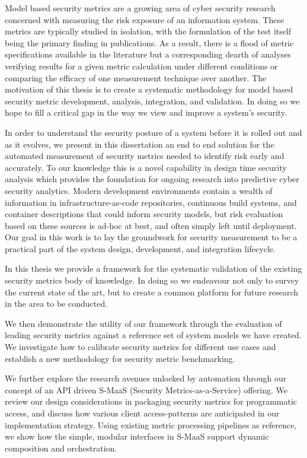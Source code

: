 Model based security metrics are a growing area of cyber security research concerned with measuring the risk exposure of an information system. These metrics are typically studied in isolation, with the formulation of the test itself being the primary finding in publications. As a result, there is a flood of metric specifications available in the literature but a corresponding dearth of analyses verifying results for a given metric calculation under different conditions or comparing the efficacy of one measurement technique over another. The motivation of this thesis is to create a systematic methodology for model based security metric development, analysis, integration, and validation. In doing so we hope to fill a critical gap in the way we view and improve a system’s security.   

In order to understand the security posture of a system before it is rolled out and as it evolves, we present in this dissertation an end to end solution for the automated measurement of security metrics needed to identify risk early and accurately. To our knowledge this is a novel capability in design time security analysis which provides the foundation for ongoing research into predictive cyber security analytics. Modern development environments contain a wealth of information in infrastructure-as-code repositories, continuous build systems, and container descriptions that could inform security models, but risk evaluation based on these sources is ad-hoc at best, and often simply left until deployment. Our goal in this work is to lay the groundwork for security measurement to be a practical part of the system design, development, and integration lifecycle.  

In this thesis we provide a framework for the systematic validation of the existing security metrics body of knowledge. In doing so we endeavour not only to survey the current state of the art, but to create a common platform for future research in the area to be conducted. 

We  then  demonstrate  the  utility  of  our  framework  through  the  evaluation  of  leading security metrics against a reference set of system models we have created.  We investigate how  to  calibrate  security  metrics  for  different  use  cases  and  establish  a new methodology  for security metric benchmarking. 

We further explore the research avenues unlocked by automation through our concept of an API driven S-MaaS (Security Metrics-as-a-Service) offering. We review our design considerations in packaging security metrics for programmatic access, and discuss how various client access-patterns are anticipated in our implementation strategy. Using existing metric processing pipelines as reference, we show how the simple, modular interfaces in S-MaaS support dynamic composition and orchestration. 

